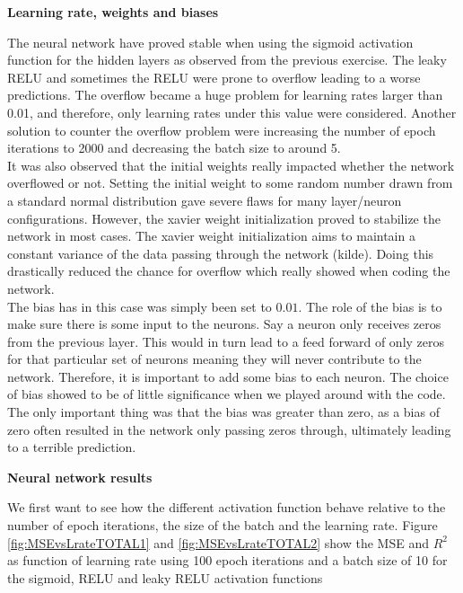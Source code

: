 \documentclass[12pt,a4paper]{article}
\begin{document}
\begin{center}
\large{\textbf{Learning rate, weights and biases}}
\end{center}

\noindent The neural network have proved stable when using the sigmoid activation function for the hidden layers as observed from the previous exercise. The leaky RELU and sometimes the RELU were prone to overflow leading to a worse predictions. The overflow became a huge problem for learning rates larger than 0.01, and therefore, only learning rates under this value were considered. Another solution to counter the overflow problem were increasing the number of epoch iterations to 2000 and decreasing the batch size to around 5. 
\\
It was also observed that the initial weights really impacted whether the network overflowed or not. Setting the initial weight to some random number drawn from a standard normal distribution gave severe flaws for many layer/neuron configurations. However, the xavier weight initialization proved to stabilize the network in most cases. The xavier weight initialization aims to maintain a constant variance of the data passing through the network (kilde). Doing this drastically reduced the chance for overflow which really showed when coding the network.
\\
The bias has in this case was simply been set to $0.01$. The role of the bias is to make sure there is some input to the neurons. Say a neuron only receives zeros from the previous layer. This would in turn lead to a feed forward of only zeros for that particular set of neurons meaning they will never contribute to the network. Therefore, it is important to add some bias to each neuron. The choice of bias showed to be of little significance when we played around with the code. The only important thing was that the bias was greater than zero, as a bias of zero often resulted in the network only passing zeros through, ultimately leading to a terrible prediction.

\begin{center}
\large{\textbf{Neural network results}}
\end{center}

\noindent We first want to see how the different activation function behave relative to the number of epoch iterations, the size of the batch and the learning rate. Figure \ref{fig:MSEvsLrateTOTAL1} and \ref{fig:MSEvsLrateTOTAL2} show the MSE and $R^2$ as function of learning rate using 100 epoch iterations and a batch size of 10 for the sigmoid, RELU and leaky RELU activation functions
\end{document}
